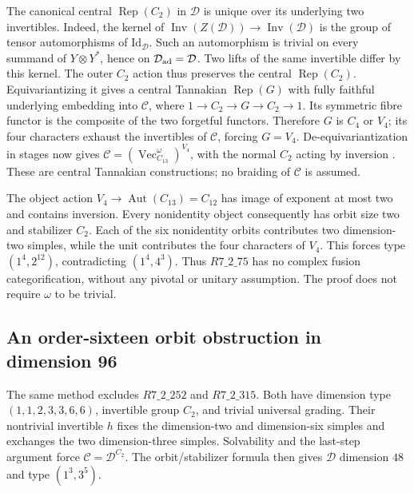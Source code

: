 \documentclass[11pt]{article}
\begin{document}
The canonical central $\operatorname{Rep}(C_2)$ in $\mathcal D$ is
unique over its underlying two invertibles. Indeed, the kernel of
$\operatorname{Inv}(Z(\mathcal D))\to\operatorname{Inv}(\mathcal D)$
is the group of tensor automorphisms of $\mathrm{Id}_{\mathcal D}$.
Such an automorphism is trivial on every summand of $Y\otimes Y^*$,
hence on $\mathcal D_{\rm ad}=\mathcal D$. Two lifts of the same
invertible differ by this kernel. The outer $C_2$ action thus preserves
the central $\operatorname{Rep}(C_2)$. Equivariantizing it gives a
central Tannakian $\operatorname{Rep}(G)$ with fully faithful underlying
embedding into $\mathcal C$, where
$1\to C_2\to G\to C_2\to1$.
Its symmetric fibre functor is the composite of the two forgetful
functors. Therefore $G$ is $C_4$ or $V_4$; its four characters exhaust
the invertibles of $\mathcal C$, forcing $G=V_4$.
De-equivariantization in stages now gives
$\mathcal C=(\operatorname{Vec}_{C_{13}}^\omega)^{V_4}$, with the
normal $C_2$ acting by inversion
\cite[Section~2.6 and Proposition~2.10]{ENOSolvable}
\cite[Theorem~4.18(i) and Proposition~4.19]{DGNO}.
These are central Tannakian constructions; no braiding of $\mathcal C$
is assumed.

The object action $V_4\to\operatorname{Aut}(C_{13})=C_{12}$ has image
of exponent at most two and contains inversion. Every nonidentity
object consequently has orbit size two and stabilizer $C_2$.
Each of the six nonidentity orbits contributes two dimension-two
simples, while the unit contributes the four characters of $V_4$.
This forces type $(1^4,2^{12})$, contradicting $(1^4,4^3)$.
Thus $R7\_2\_75$ has no complex fusion categorification, without any
pivotal or unitary assumption. The proof does not require $\omega$
to be trivial.

\subsection{An order-sixteen orbit obstruction in dimension 96}
The same method excludes $R7\_2\_252$ and $R7\_2\_315$.
Both have dimension type $(1,1,2,3,3,6,6)$, invertible group $C_2$,
and trivial universal grading. Their nontrivial invertible $h$ fixes
the dimension-two and dimension-six simples and exchanges the two
dimension-three simples. Solvability and the last-step argument force
$\mathcal C=\mathcal D^{C_2}$. The orbit/stabilizer formula then gives
$\mathcal D$ dimension $48$ and type $(1^3,3^5)$.
\end{document}
